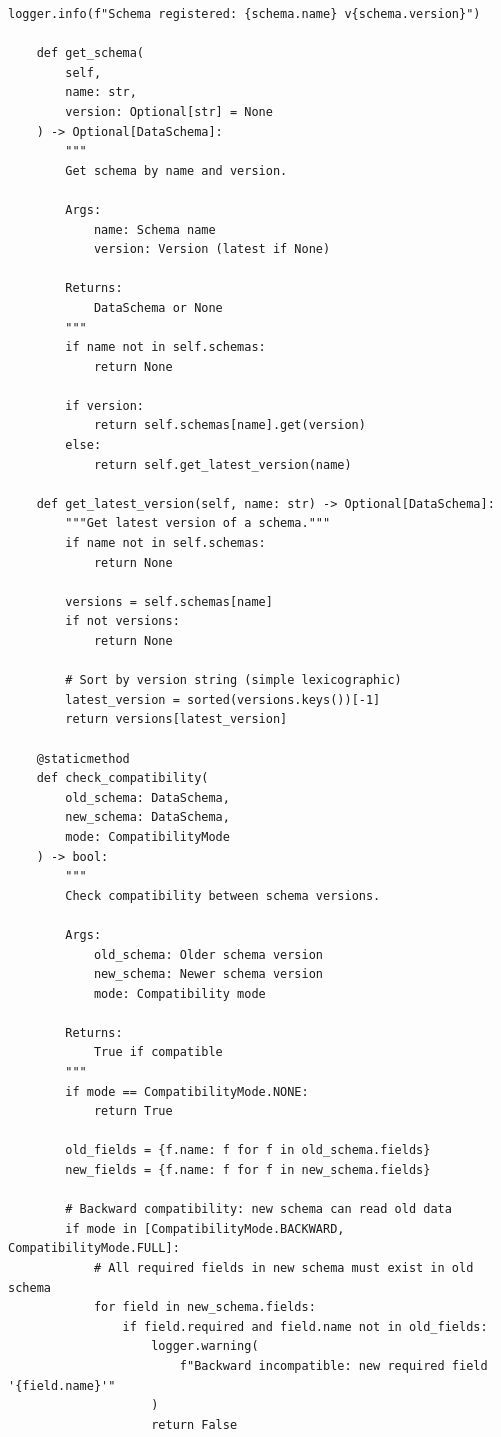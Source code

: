 \begin{lstlisting}[style=python, caption={Schema registry with versioning and compatibility}]
        logger.info(f"Schema registered: {schema.name} v{schema.version}")

    def get_schema(
        self,
        name: str,
        version: Optional[str] = None
    ) -> Optional[DataSchema]:
        """
        Get schema by name and version.

        Args:
            name: Schema name
            version: Version (latest if None)

        Returns:
            DataSchema or None
        """
        if name not in self.schemas:
            return None

        if version:
            return self.schemas[name].get(version)
        else:
            return self.get_latest_version(name)

    def get_latest_version(self, name: str) -> Optional[DataSchema]:
        """Get latest version of a schema."""
        if name not in self.schemas:
            return None

        versions = self.schemas[name]
        if not versions:
            return None

        # Sort by version string (simple lexicographic)
        latest_version = sorted(versions.keys())[-1]
        return versions[latest_version]

    @staticmethod
    def check_compatibility(
        old_schema: DataSchema,
        new_schema: DataSchema,
        mode: CompatibilityMode
    ) -> bool:
        """
        Check compatibility between schema versions.

        Args:
            old_schema: Older schema version
            new_schema: Newer schema version
            mode: Compatibility mode

        Returns:
            True if compatible
        """
        if mode == CompatibilityMode.NONE:
            return True

        old_fields = {f.name: f for f in old_schema.fields}
        new_fields = {f.name: f for f in new_schema.fields}

        # Backward compatibility: new schema can read old data
        if mode in [CompatibilityMode.BACKWARD, CompatibilityMode.FULL]:
            # All required fields in new schema must exist in old schema
            for field in new_schema.fields:
                if field.required and field.name not in old_fields:
                    logger.warning(
                        f"Backward incompatible: new required field '{field.name}'"
                    )
                    return False


\end{lstlisting}
